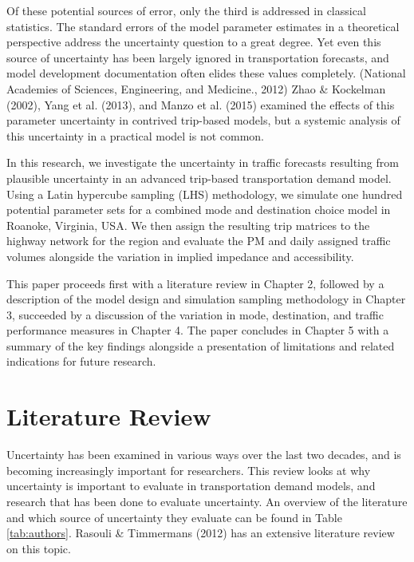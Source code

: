 \documentclass[fancy, masters,twoside]{byuthesis}
\begin{document}
Of these potential sources of error, only the third is addressed in classical statistics. The standard errors of the model parameter estimates in a theoretical perspective address the uncertainty question to a great degree. Yet even this source of uncertainty has been largely ignored in transportation forecasts, and model development documentation often elides these values completely. (National Academies of Sciences, Engineering, and Medicine., 2012) Zhao \& Kockelman (2002), Yang et al. (2013), and Manzo et al. (2015) examined the effects of this parameter uncertainty in contrived trip-based models, but a systemic analysis of this uncertainty in a practical model is not common.

In this research, we investigate the uncertainty in traffic forecasts resulting from plausible uncertainty in an advanced trip-based transportation demand model. Using a Latin hypercube sampling (LHS) methodology, we simulate one hundred potential parameter sets for a combined mode and destination choice model in Roanoke, Virginia, USA. We then assign the resulting trip matrices to the highway network for the region and evaluate the PM and daily assigned traffic volumes alongside the variation in implied impedance and accessibility.

This paper proceeds first with a literature review in Chapter 2, followed by a description of the model design and simulation sampling methodology in Chapter 3, succeeded by a discussion of the variation in mode, destination, and traffic performance measures in Chapter 4. The paper concludes in Chapter 5 with a summary of the key findings alongside a presentation of limitations and related indications for future research.

\hypertarget{literature-review}{%
\chapter{Literature Review}\label{literature-review}}

Uncertainty has been examined in various ways over the last two decades, and is becoming increasingly important for researchers. This review looks at why uncertainty is important to evaluate in transportation demand models, and research that has been done to evaluate uncertainty. An overview of the literature and which source of uncertainty they evaluate can be found in Table \ref{tab:authors}. Rasouli \& Timmermans (2012) has an extensive literature review on this topic.
\end{document}
